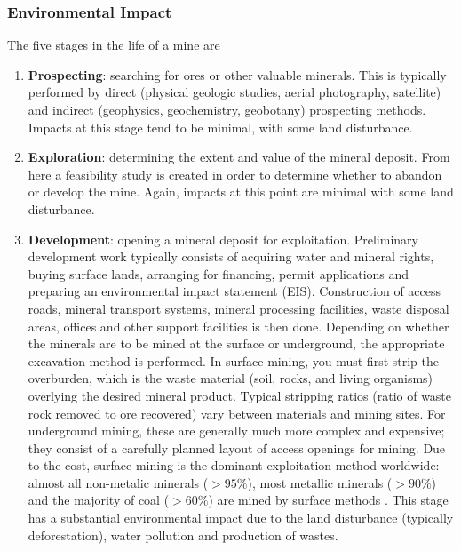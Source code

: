 \documentclass{article}
\begin{document}
\subsubsection{Environmental Impact}
The five stages in the life of a mine are \cite{hartman2002introductory}
\begin{enumerate}
    \item \textbf{Prospecting}: searching for ores or other valuable minerals. This is typically performed by direct (physical geologic studies, aerial photography, satellite) and indirect (geophysics, geochemistry, geobotany) prospecting methods. Impacts at this stage tend to be minimal, with some land disturbance.
    \item \textbf{Exploration}: determining the extent and value of the mineral deposit. From here a feasibility study is created in order to determine whether to abandon or develop the mine. Again, impacts at this point are minimal with some land disturbance.
    \item \textbf{Development}: opening a mineral deposit for exploitation. Preliminary development work typically consists of acquiring water and mineral rights, buying surface lands, arranging for financing, permit applications and preparing an environmental impact statement (EIS). Construction of access roads, mineral transport systems, mineral processing facilities, waste disposal areas, offices and other support facilities is then done. Depending on whether the minerals are to be mined at the surface or underground, the appropriate excavation method is performed. In surface mining, you must first strip the overburden, which is the waste material (soil, rocks, and living organisms) overlying the desired mineral product. Typical stripping ratios (ratio of waste rock removed to ore recovered) vary between materials and mining sites. For underground mining, these are generally much more complex and expensive; they consist of a carefully planned layout of access openings for mining. Due to the cost, surface mining is the dominant exploitation method worldwide: almost all non-metalic minerals ($>95\%$), most metallic minerals ($>90\%$) and the majority of coal ($>60\%$) are mined by surface methods \cite{ramani2012surface}. This stage has a substantial environmental impact due to the land disturbance (typically deforestation), water pollution and production of wastes.
    

\end{enumerate}
\end{document}
